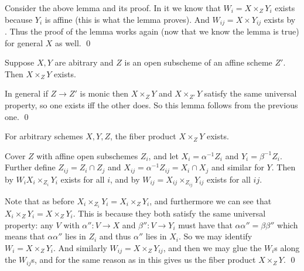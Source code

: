 \elemm

\bproof

    Consider the above lemma and its proof.
    In it we know that $W_i=X\times_ZY_i$ exists because $Y_i$ is affine (this is what the lemma proves).
    And $W_{ij}=X\times Y_{ij}$ exists by .
    Thus the proof of the lemma works again (now that we know the lemma is true) for general $X$ as well.
    \qed

\eproof

\blemm[name={pullbackxyarbzalmostaffine}]

    Suppose $X,Y$ are abitrary and $Z$ is an open subscheme of an affine scheme $Z'$.
    Then $X\times_ZY$ exists.

\elemm

\bproof

    In general if $Z\to Z'$ is monic then $X\times_ZY$ and $X\times_{Z'}Y$ satisfy the same universal property,
    so one exists iff the other does.
    So this lemma follows from the previous one.
    \qed

\eproof

\bthrm[name={fiberproductsexist}]

    For arbitrary schemes $X,Y,Z$, the fiber product $X\times_ZY$ exists.

\ethrm

\bproof

    Cover $Z$ with affine open subschemes $Z_i$, and let $X_i=\alpha^{-1}Z_i$ and $Y_i=\beta^{-1}Z_i$.
    Further define $Z_{ij}=Z_i\cap Z_j$ and $X_{ij}=\alpha^{-1}Z_{ij}=X_i\cap X_j$ and similar for $Y$.
    Then by  $W_iX_i\times_{Z_i}Y_i$ exists for all $i$, and by
     $W_{ij}=X_{ij}\times_{Z_{ij}}Y_{ij}$ exists for all $ij$.

    Note that as before $X_i\times_{Z_i}Y_i=X_i\times_ZY_i$, and furthermore we can see that
    $X_i\times_ZY_i=X\times_ZY_i$.
    This is because they both satisfy the same universal property: any $V$ with
    $\alpha''\colon V\to X$ and $\beta''\colon V\to Y_i$ must have that $\alpha\alpha''=\beta\beta''$
    which means that $\alpha\alpha''$ lies in $Z_i$ and thus $\alpha''$ lies in $X_i$.
    So we may identify $W_i=X\times_ZY_i$.
    And similarly $W_{ij}=X\times_ZY_{ij}$, and then we may glue the $W_i$s along the $W_{ij}$s, and for
    the same reason as in  this gives us the fiber product
    $X\times_ZY$.
    \qed

\eproof

